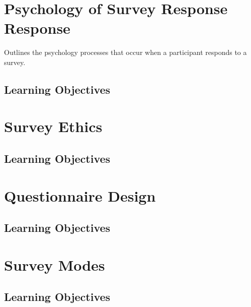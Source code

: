 \documentclass[
  letterpaper,
  DIV=11,
  numbers=noendperiod]{scrreprt}
\begin{document}

\hypertarget{psychology-of-survey-response-response}{%
\chapter{Psychology of Survey Response
Response}\label{psychology-of-survey-response-response}}

Outlines the psychology processes that occur when a participant responds
to a survey.

\hypertarget{learning-objectives-1}{%
\section{Learning Objectives}\label{learning-objectives-1}}


\hypertarget{survey-ethics}{%
\chapter{Survey Ethics}\label{survey-ethics}}

\hypertarget{learning-objectives-2}{%
\section{Learning Objectives}\label{learning-objectives-2}}


\hypertarget{questionnaire-design}{%
\chapter{Questionnaire Design}\label{questionnaire-design}}

\hypertarget{learning-objectives-3}{%
\section{Learning Objectives}\label{learning-objectives-3}}


\hypertarget{survey-modes}{%
\chapter{Survey Modes}\label{survey-modes}}

\hypertarget{learning-objectives-4}{%
\section{Learning Objectives}\label{learning-objectives-4}}
\end{document}
